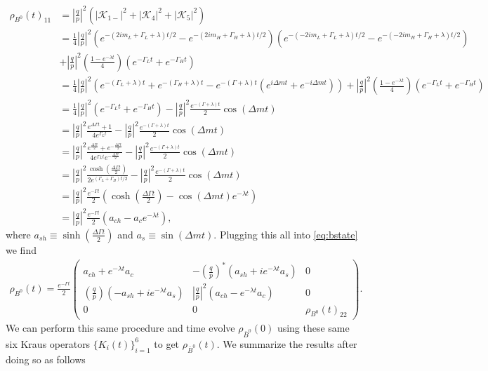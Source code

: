 \begin{align}
\rho_{B^0}(t)_{11} &= \left|\frac{q}{p}\right|^2(|\mathcal{K}_{1-}|^2 + |\mathcal{K}_4|^2 + |\mathcal{K}_5|^2) \nonumber \\
&= \frac{1}{4}\left|\frac{q}{p}\right|^2\left(e^{-(2im_L+\Gamma_L +\lambda)t/2}-e^{-(2im_H+\Gamma_H +\lambda)t/2}\right)\left(e^{-(-2im_L+\Gamma_L +\lambda)t/2}-e^{-(-2im_H+\Gamma_H +\lambda)t/2}\right) \nonumber \\
&+ \left|\frac{q}{p}\right|^2\left(\frac{1-e^{-\lambda t}}{4}\right)(e^{-\Gamma_L t} + e^{-\Gamma_H t}) \nonumber \\
&= \frac{1}{4}\left|\frac{q}{p}\right|^2\left(e^{-(\Gamma_L + \lambda)t} + e^{-(\Gamma_H + \lambda)t} - e^{-(\Gamma+\lambda)t}\left(e^{i\Delta m t}+e^{-i\Delta m t}\right)\right)+ \left|\frac{q}{p}\right|^2\left(\frac{1-e^{-\lambda t}}{4}\right)(e^{-\Gamma_L t} + e^{-\Gamma_H t}) \nonumber \\
&= \frac{1}{4}\left|\frac{q}{p}\right|^2(e^{-\Gamma_L t} + e^{-\Gamma_H t})-\left|\frac{q}{p}\right|^2\frac{e^{-(\Gamma + \lambda) t}}{2}\cos(\Delta m t) \nonumber \\
&= \left|\frac{q}{p}\right|^2\frac{e^{\Delta \Gamma t}+1}{4e^{\Gamma_L t}} -\left|\frac{q}{p}\right|^2 \frac{e^{-(\Gamma + \lambda) t}}{2}\cos(\Delta m t) \nonumber \\
&= \left|\frac{q}{p}\right|^2\frac{e^{\frac{\Delta \Gamma t}{2}}+e^{-\frac{\Delta \Gamma t}{2}}}{4e^{\Gamma_L t}e^{-\frac{\Delta \Gamma t}{2}}} -\left|\frac{q}{p}\right|^2 \frac{e^{-(\Gamma + \lambda) t}}{2}\cos(\Delta m t) \nonumber \\
&= \left|\frac{q}{p}\right|^2\frac{\cosh\left(\frac{\Delta \Gamma t}{2}\right)}{2e^{(\Gamma_L+\Gamma_H)t/2}} -\left|\frac{q}{p}\right|^2 \frac{e^{-(\Gamma + \lambda) t}}{2}\cos(\Delta m t) \nonumber \\
&= \left|\frac{q}{p}\right|^2\frac{e^{-\Gamma t}}{2}\left(\cosh\left(\frac{\Delta \Gamma t}{2}\right) - \cos(\Delta m t)e^{-\lambda t}\right) \nonumber \\
&= \left|\frac{q}{p}\right|^2\frac{e^{-\Gamma t}}{2}\left(a_{ch} - a_c e^{-\lambda t}\right),
\end{align}
where $a_{sh}\equiv \sinh\left(\frac{\Delta \Gamma t}{2}\right)$ and $a_s\equiv \sin(\Delta m t)$. Plugging this all into \ref{eq:bstate} we find
\begin{align}
\rho_{B^0}(t) = \frac{e^{-\Gamma t}}{2}\begin{pmatrix}
a_{ch} + e^{-\lambda t}a_c & -\left(\frac{q}{p}\right)^*\left(a_{sh}+ ie^{-\lambda t}a_s\right) & 0 \\ 
\left(\frac{q}{p}\right)\left(-a_{sh} + ie^{-\lambda t}a_s \right) & \left|\frac{q}{p}\right|^2 \left(a_{ch}- e^{-\lambda t}a_c\right) & 0 \\
0 & 0 & \rho_{B^0}(t)_{22}
\end{pmatrix}.
\end{align}
We can perform this same procedure and time evolve $\rho_{\bar{B}^0}(0)$ using these same six Kraus operators $\{K_i(t)\}_{i=1}^{6}$ to get $\rho_{\bar{B}^0}(t)$. We summarize the results after doing so as follows

